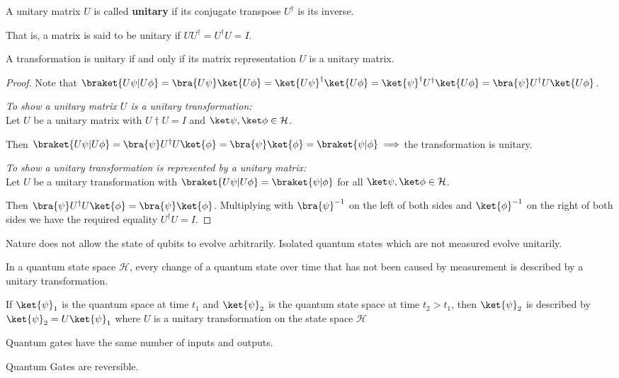 \begin{defn}
    A unitary matrix $U$ is called \textbf{unitary} if its conjugate transpose $U^\dagger$ is its inverse.

    That is, a matrix is said to be unitary if $U U^\dagger = U^\dagger U = I$.
\end{defn}

\begin{thm}
A transformation is unitary if and only if its matrix representation $U$ is a unitary matrix.
\end{thm}
\begin{proof}
    Note that $\braket{U \psi | U \phi} = \bra{U \psi} \ket{U \phi} = \ket{U \psi}^\dagger \ket{U \phi} = \ket{\psi}^\dagger U^\dagger \ket{U \phi} = \bra{\psi} U^\dagger U \ket{U\phi}$.

    \emph{To show a unitary matrix $U$ is a unitary transformation: }\\
    Let $U$ be a unitary matrix with $U\dagger U = I$ and $\ket\psi, \ket\phi \in \mathcal{H}$.

    Then $\braket{U \psi | U \phi} = \bra{\psi} U^\dagger U \ket{\phi} = \bra{\psi} \ket{\phi} = \braket{\psi|\phi} \implies $the transformation is unitary.

    \emph{To show a unitary transformation is represented by a unitary matrix: }\\
    Let $U$ be a unitary transformation with $\braket{U \psi | U \phi} = \braket{\psi|\phi}$ for all $\ket\psi, \ket\phi \in \mathcal{H}$.

    Then  $\bra{\psi} U^\dagger U \ket{\phi} = \bra{\psi} \ket{\phi}$.
    Multiplying with $\bra{\psi}^{-1}$ on the left of both sides and $\ket{\phi}^{-1}$ on the right of both sides we have the required equality $U^\dagger U = I$.
\end{proof}

Nature does not allow the state of qubits to evolve arbitrarily. Isolated quantum states which are not measured evolve unitarily.

\begin{samepage}
\begin{mdframed}
\begin{lemma}
    \label{transformation}
    In a quantum state space $\mathcal{H}$, every change of a quantum state over time that has not been caused by measurement is described by a unitary transformation.
    
    If $\ket{\psi}_1$ is the quantum space at time $t_1$ and $\ket{\psi}_2$ is the quantum state space at time $t_2 > t_1$, then $\ket{\psi}_2$ is described by $\ket{\psi}_2 = U \ket{\psi}_1$ where $U$ is a unitary transformation on the state space $\mathcal{H}$
\end{lemma}
\end{mdframed}
\end{samepage}

\begin{lemma}
    Quantum gates have the same number of inputs and outputs.
\end{lemma}

\begin{lemma}
    Quantum Gates are reversible.
\end{lemma}

\begin{prop}
\end{prop}
